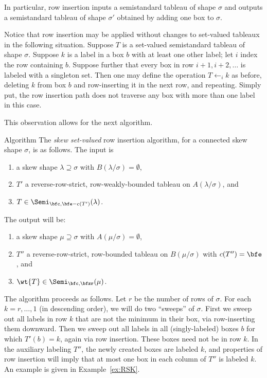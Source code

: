 In particular, row insertion inputs a semistandard tableau of shape $\sigma$ and outputs a semistandard tableau of shape $\sigma'$ obtained by adding one box to $\sigma$.

\begin{rema}
Notice that row insertion may be applied without changes to set-valued tableaux in the following situation. Suppose $T$ is a set-valued semistandard tableau of shape $\sigma$. Suppose $k$ is a label in a box $b$ with at least one other label; let $i$ index the row containing $b$. Suppose further that every box in row $i+1,i+2,\ldots$ is labeled with a singleton set. Then one may define the operation $T\leftarrow_i k$ as before, deleting $k$ from box $b$ and row-inserting it in the next row, and repeating. Simply put, the row insertion path does not traverse any box with more than one label in this case.

This observation allows for the next algorithm.
\end{rema}

\begin{enonce}{Algorithm}\label{algorithm}
The \emph{skew set-valued} row insertion algorithm, for a connected skew shape $\sigma$, is as follows. The input is

\begin{enumerate}
\item\label{algo3.12_1_1} a skew shape $\lambda \supseteq \sigma$ with $B(\lambda/\sigma)=\emptyset$,
\item\label{algo3.12_1_2} $T'$ a reverse-row-strict, row-weakly-bounded tableau on $A(\lambda/\sigma)$, and
\item\label{algo3.12_1_3} $T\in \Semi_{\bfc,\bfe-c(T')}(\lambda)$.
\end{enumerate}

The output will be:
\begin{enumerate}
\item\label{algo3.12_2_1} a skew shape $\mu\supseteq \sigma$ with $A(\mu/\sigma)=\emptyset$,
\item\label{algo3.12_2_2} $T''$ a reverse-row-strict, row-bounded tableau on $B(\mu/\sigma)$ with $c(T'')=\bfe$, and
\item\label{algo3.12_2_3} $\wt{T} \in \Semi_{\bfc,\bfzr}(\mu)$.
\end{enumerate}
\end{enonce}

The algorithm proceeds as follows. Let $r$ be the number of rows of $\sigma$. For each $k=r,\ldots,1$ (in descending order), we will do two ``sweeps'' of $\sigma$. First we sweep out all labels in row $k$ that are not the minimum in their box, via row-inserting them downward. Then we sweep out all labels in all (singly-labeled) boxes $b$ for which $T'(b) = k$, again via row insertion. These boxes need not be in row $k$. In the auxiliary labeling $T''$, the newly created boxes are labeled $k$, and properties of row insertion will imply that at most one box in each column of $T''$ is labeled $k$. An example is given in Example~\ref{ex:RSK}. 

